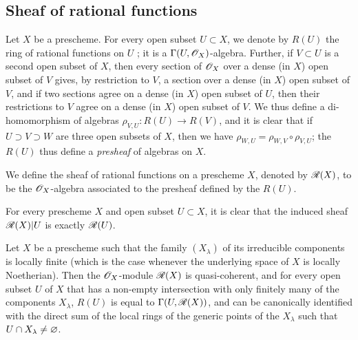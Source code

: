 \subsection{Sheaf of rational functions}
\label{subsection-sheaf-of-rational-functions}

\begin{env}[7.3.1]
\label{1.7.3.1}
Let $X$ be a prescheme.
For every open subset $U\subset X$, we denote by $R(U)$ the ring of rational functions on $U$ ; it is a $\Gamma(U,\mathscr{O}_X)$-algebra.
Further, if $V\subset U$ is a second open subset of $X$, then every section of $\mathscr{O}_X$ over a dense (in $X$) open subset of $V$ gives, by restriction to $V$, a section over a dense (in $X$) open subset of $V$, and if two sections agree on a dense (in $X$) open subset of $U$, then their restrictions to $V$ agree on a dense (in $X$) open subset of $V$.
We thus define a di-homomorphism of algebras $\rho_{V,U}\colon R(U)\to R(V)$, and it is clear that if $U\supset V\supset W$ are three open subsets of $X$, then we have $\rho_{W,U}=\rho_{W,V}\circ\rho_{V,U}$; the $R(U)$ thus define a \emph{presheaf} of algebras on $X$.
\end{env}

\begin{defn}[7.3.2]
\label{1.7.3.2}
We define the sheaf of rational functions on a prescheme $X$, denoted by $\mathscr{R}(X)$, to be the $\mathscr{O}_X$-algebra associated to the presheaf defined by the $R(U)$.
\end{defn}

For every prescheme $X$ and open subset $U\subset X$, it is clear that the induced sheaf $\mathscr{R}(X)|U$ is exactly $\mathscr{R}(U)$.

\begin{prop}[7.3.3]
\label{1.7.3.3}
Let $X$ be a prescheme such that the family $(X_\lambda)$ of its irreducible components is locally finite (which is the case whenever the underlying space of $X$ is locally Noetherian).
Then the $\mathscr{O}_X$-module $\mathscr{R}(X)$ is quasi-coherent, and for every open subset $U$ of $X$ that has a non-empty intersection with only finitely many of the components $X_\lambda$, $R(U)$ is equal to $\Gamma(U,\mathscr{R}(X))$, and can be canonically identified with the direct sum of the local rings of the generic points of the $X_\lambda$ such that $U\cap X_\lambda\neq\varnothing$.
\end{prop}

